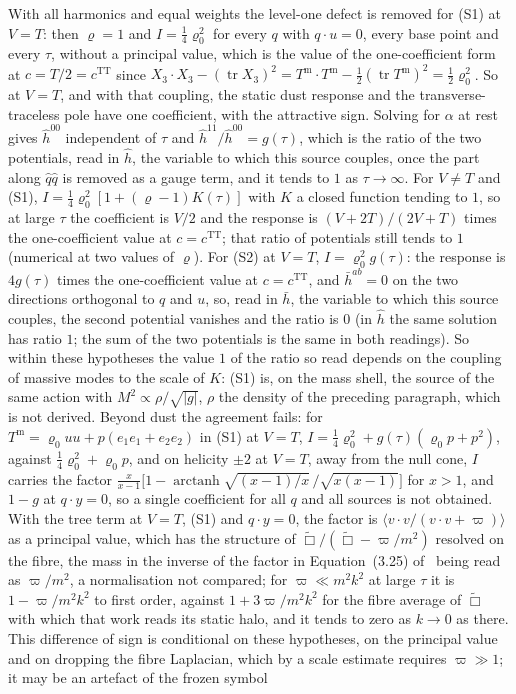 With all harmonics and equal weights the level-one defect is removed for (S1) at \(V=T\): then \(\varrho=1\) and \(I=\tfrac14\varrho_0^2\) for every \(q\) with \(q\cdot u=0\), every base point and every \(\tau\), without a principal value, which is the value of the one-coefficient form at \(c=T/2=c^{\mathrm{TT}}\) since \(X_3\cdot X_3-(\operatorname{tr}X_3)^2=T^{\mathrm m}\cdot T^{\mathrm m}-\tfrac12(\operatorname{tr}T^{\mathrm m})^2=\tfrac12\varrho_0^2\). So at \(V=T\), and with that coupling, the static dust response and the transverse-traceless pole have one coefficient, with the attractive sign. Solving for \(\alpha\) at rest gives \(\hat h^{00}\) independent of \(\tau\) and \(\hat h^{11}/\hat h^{00}=g(\tau)\), which is the ratio of the two potentials, read in \(\hat h\), the variable to which this source couples, once the part along \(\hat q\hat q\) is removed as a gauge term, and it tends to \(1\) as \(\tau\to\infty\). For \(V\neq T\) and (S1), \(I=\tfrac14\varrho_0^2[1+(\varrho-1)K(\tau)]\) with \(K\) a closed function tending to \(1\), so at large \(\tau\) the coefficient is \(V/2\) and the response is \((V+2T)/(2V+T)\) times the one-coefficient value at \(c=c^{\mathrm{TT}}\); that ratio of potentials still tends to \(1\) (numerical at two values of \(\varrho\)). For (S2) at \(V=T\), \(I=\varrho_0^2g(\tau)\): the response is \(4g(\tau)\) times the one-coefficient value at \(c=c^{\mathrm{TT}}\), and \(\bar h^{ab}=0\) on the two directions orthogonal to \(q\) and \(u\), so, read in \(\bar h\), the variable to which this source couples, the second potential vanishes and the ratio is \(0\) (in \(\hat h\) the same solution has ratio \(1\); the sum of the two potentials is the same in both readings). So within these hypotheses the value \(1\) of the ratio so read depends on the coupling of massive modes to the scale of \(K\): (S1) is, on the mass shell, the source of the same action with \(M^2\propto\rho/\sqrt{|g|}\), \(\rho\) the density of the preceding paragraph, which is not derived. Beyond dust the agreement fails: for \(T^{\mathrm m}=\varrho_0uu+p(e_1e_1+e_2e_2)\) in (S1) at \(V=T\), \(I=\tfrac14\varrho_0^2+g(\tau)(\varrho_0p+p^2)\), against \(\tfrac14\varrho_0^2+\varrho_0p\), and on helicity \(\pm2\) at \(V=T\), away from the null cone, \(I\) carries the factor \(\tfrac{x}{x-1}\bigl[1-\operatorname{arctanh}\sqrt{(x-1)/x}\,/\sqrt{x(x-1)}\bigr]\) for \(x>1\), and \(1-g\) at \(q\cdot y=0\), so a single coefficient for all \(q\) and all sources is not obtained. With the tree term at \(V=T\), (S1) and \(q\cdot y=0\), the factor is \(\langle v\cdot v/(v\cdot v+\varpi)\rangle\) as a principal value, which has the structure of \(\tilde\Box/(\tilde\Box-\varpi/m^2)\) resolved on the fibre, the mass in the inverse of the factor in Equation~(3.25) of~\cite{Steinacker2026} being read as \(\varpi/m^2\), a normalisation not compared; for \(\varpi\ll m^2k^2\) at large \(\tau\) it is \(1-\varpi/m^2k^2\) to first order, against \(1+3\varpi/m^2k^2\) for the fibre average of \(\tilde\Box\) with which that work reads its static halo, and it tends to zero as \(k\to0\) as there. This difference of sign is conditional on these hypotheses, on the principal value and on dropping the fibre Laplacian, which by a scale estimate requires \(\varpi\gg1\); it may be an artefact of the frozen symbol 